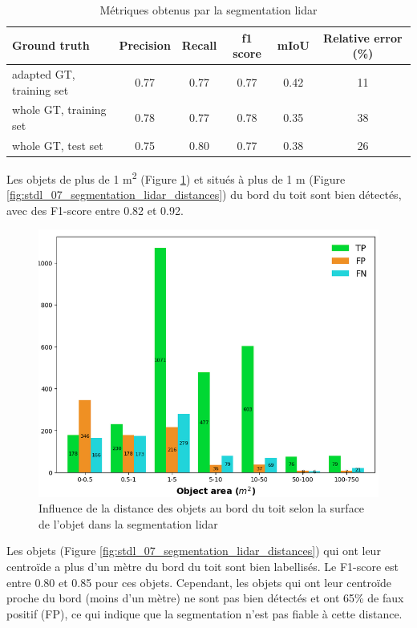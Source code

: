 \begin{table}[H]
    \centering
    \begin{tabular}{|l|c|c|c|c|c|}
    \hline
    Ground truth & Precision & Recall & f1 score & mIoU & Relative error (\%) \\
    \hline
    adapted GT, training set & 0.77 & 0.77 & 0.77 & 0.42 & 11 \\
    whole GT, training set & 0.78 & 0.77 & 0.78 & 0.35 & 38 \\
    whole GT, test set & 0.75 & 0.80 & 0.77 & 0.38 & 26 \\
    \hline
    \end{tabular}
    \caption{Métriques obtenus par la segmentation \gls{lidar}}
    \label{tab:stdl_02_resultats_segmentation_lidar}
\end{table}

\par{Les objets de plus de 1 \si{\unit{m^2}} (Figure \ref{fig:stdl_06_segmentation_lidar_surfaces}) et situés à plus de 1 m (Figure \ref{fig:stdl_07_segmentation_lidar_distances}) du bord du toit sont bien détectés, avec des F1-score entre 0.82 et 0.92.}
\begin{figure}[H]
    \centering
    \includegraphics[width=1\linewidth]{02-main//figures/ch2/stdl_06_segmentation_lidar_surfaces.png}
    \caption{Influence de la distance des objets au bord du toit selon la surface de l’objet dans la segmentation \gls{lidar} \cite{herny_detection_2024}}
    \label{fig:stdl_06_segmentation_lidar_surfaces}
\end{figure}
\newpage
\par{Les objets (Figure \ref{fig:stdl_07_segmentation_lidar_distances}) qui ont leur centroïde a plus d'un mètre du bord du toit sont bien labellisés. Le F1-score est entre 0.80 et 0.85 pour ces objets. Cependant, les objets qui ont leur centroïde proche du bord (moins d'un mètre) ne sont pas bien détectés et ont 65\% de faux positif (FP), ce qui indique que la segmentation n'est pas fiable à cette distance.}

